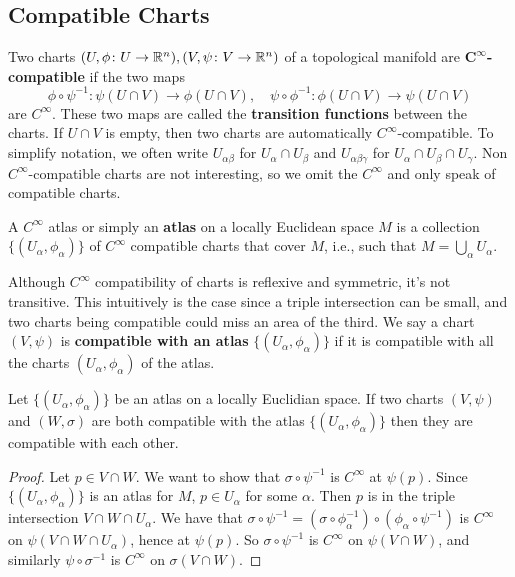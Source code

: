 \subsection{Compatible Charts}
\begin{definition}[]
    Two charts $(U, \phi \colon U \to \mathbb{R}^n ), (V, \psi \colon V \to \mathbb{R}^n )$ of a topological manifold are $\mathbf {C^{\infty}}$\textbf{-compatible} if the two maps \[
        \phi \circ \psi ^{-1} \colon \psi (U \cap V) \to \phi(U \cap V), \quad \psi \circ \phi^{-1}\colon \phi(U \cap V) \to \psi (U \cap V)
    \] are $C^{\infty}.$ These two maps are called the \textbf{transition functions} between the charts. If $U \cap V$ is empty, then two charts are automatically $C^{\infty}$-compatible. To simplify notation, we often write $U_{\alpha \beta }$ for $U_{\alpha }\cap U_{\beta }$ and $U_{\alpha \beta \gamma }$ for $U_{\alpha }\cap U_{\beta }\cap U_{\gamma }$. Non $C^{\infty}$-compatible charts are not interesting, so we omit the $C^{\infty}$ and only speak of compatible charts.
\end{definition}
\begin{definition}[]
    A $C^{\infty}$ atlas or simply an \textbf{atlas} on a locally Euclidean space $M$ is a collection $\{(U_{\alpha },\phi _{\alpha })\} $ of $C^{\infty}$ compatible charts that cover $M$, i.e., such that $M= \bigcup_{\alpha } U_{\alpha }.$
\end{definition}
Although $C^{\infty}$ compatibility of charts is reflexive and symmetric, it's not transitive. This intuitively is the case since a triple intersection can be small, and two charts being compatible could miss an area of the third. We say a chart $(V,\psi)$ is \textbf{compatible with an atlas} $\{(U_{\alpha }, \phi _{\alpha })\} $ if it is compatible with all the charts $(U_{\alpha }, \phi _{\alpha })$ of the atlas.
\begin{lemma}\label{compatible}
    Let $\{(U_{\alpha },\phi_{\alpha })\} $ be an atlas on a locally Euclidian space. If two charts $(V,\psi)$ and $(W,\sigma)$ are both compatible with the atlas $\{(U_{\alpha },\phi _{\alpha })\} $ then they are compatible with each other.
\end{lemma}
\begin{proof}
    Let $p \in  V \cap W$. We want to show that $\sigma \circ \psi ^{-1}$ is $C^{\infty}$ at $\psi (p)$. Since $\{(U_{\alpha },\phi_{\alpha })\} $ is an atlas for $M$, $p \in U_{\alpha }$ for some $\alpha $. Then $p$ is in the triple intersection $V \cap W \cap U_{\alpha }$. We have that $\sigma \circ \psi ^{-1} = (\sigma \circ \phi _{\alpha }^{-1})\circ (\phi _{\alpha} \circ \psi ^{-1})$ is $C^{\infty}$ on $\psi (V \cap W\cap U_{\alpha })$, hence at $\psi (p)$. So $\sigma \circ \psi ^{-1}$ is $C^{\infty}$ on $\psi(V\cap W)$, and similarly $\psi \circ \sigma ^{-1}$ is $C^{\infty}$ on $\sigma(V \cap W)$.
\end{proof}
